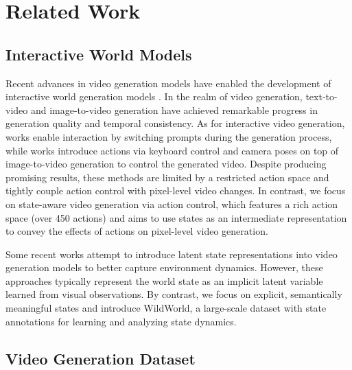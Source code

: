 \section{Related Work}
\subsection{Interactive World Models}

Recent advances in video generation models \cite{sora2,longlive,hacohen2026ltx} have enabled the development of interactive world generation models \cite{genie,cosmos,wan2025wan}.
In the realm of video generation,
text-to-video \cite{chen2024videocrafter2,li2024t2v,yume} and image-to-video generation \cite{xing2024dynamicrafter,xu2024easyanimate,shi2024motion,wan2025wan} have achieved remarkable progress in generation quality and temporal consistency.
As for interactive video generation,
works \cite{yume1_5,genie3,team2026advancing} enable interaction by switching prompts during the generation process,
while works \cite{genie3,hyworld2025,gao2025longvie, matrixgame1,matrixgame2,hunyuangame,yan,voyager} introduce actions via keyboard control \cite{matrixgame2,genie3} and camera poses \cite{camctrl1, camctrl2} on top of image-to-video generation to control the generated video.
Despite producing promising results, these methods are limited by a restricted action space and tightly couple action control with pixel-level video changes.
In contrast, we focus on state-aware video generation via action control, which features a rich action space (over 450 actions) and aims to use states as an intermediate representation to convey the effects of actions on pixel-level video generation.

Some recent works \cite{wang2026mechanistic, yue2025simulating, garrido2026learning, lillemarkflow, 3d_as_code} attempt to introduce latent state representations into video generation models to better capture environment dynamics.
However, these approaches typically represent the world state as an implicit latent variable learned from visual observations.
By contrast, we focus on explicit, semantically meaningful states and introduce WildWorld, a large-scale dataset with state annotations for learning and analyzing state dynamics.

\subsection{Video Generation Dataset}


